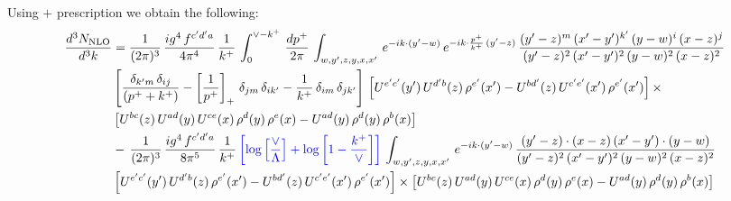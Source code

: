 \documentclass[9pt]{article}
\numberwithin{equation}{section}
\begin{document}
Using $+$ prescription we obtain the following:
\begin{align}
    \frac{d^{3}N_{\rm NLO}}{d^{3}k} & = \frac{1}{(2\pi)^{3}}\, \frac{ig^{4}\,f^{c'd'a}}{4\pi^{4}}\, \frac{1}{k^{+}}\,\int_{0}^{\vee-k^{+}}\, \frac{dp^{+}}{2\pi}\, \int_{w,y',z,y,x,x'}\, e^{-ik\cdot (y'-w)}\, e^{-ik\cdot \frac{p^{+}}{k^{+}}\,(y'-z)}\,\frac{(y'-z)^{m}\,(x'-y')^{k'}\,(y-w)^{i}\,(x-z)^{j}}{(y'-z)^{2}\,(x'-y')^{2}\,(y-w)^{2}\,(x-z)^{2}}\notag \\ & \left[\frac{\delta_{k'm}\,\delta_{ij}}{(p^{+}+k^{+})}-\left[\frac{1}{p^{+}}\right]_{+}\,\delta_{jm}\,\delta_{ik'}-\frac{1}{k^{+}}\, \delta_{im}\, \delta_{jk'}\right]\, \left[U^{e'c'}(y')\,U^{d'b}(z)\,\rho^{e'}(x')-U^{bd'}(z)\,U^{c'e'}(x')\,\rho^{e'}(x')\right]\times\notag \\ &  \left[U^{bc}(z)\,U^{ad}(y)\,U^{ce}(x)\,\rho^{d}(y)\,\rho^{e}(x)-U^{ad}(y)\,\rho^{d}(y)\,\rho^{b}(x)\right]\notag \\ &  -\,\frac{1}{(2\pi)^{3}}\, \frac{ig^{4}\,f^{c'd'a}}{8\pi^{5}}\, \frac{1}{k^{+}}\,{\color{blue}\left[\log{\left[\frac{\vee}{\Lambda}\right]} + \log{\left[1-\frac{k^{+}}{\vee}\right]}\right]}\, \int_{w,y',z,y,x,x'}\, e^{-ik\cdot (y'-w)}\,\frac{(y'-z)\cdot (x-z)\,(x'-y')\cdot (y-w)}{(y'-z)^{2}\,(x'-y')^{2}\,(y-w)^{2}\,(x-z)^{2}}\notag \\ & \left[U^{e'c'}(y')\,U^{d'b}(z)\,\rho^{e'}(x')-U^{bd'}(z)\,U^{c'e'}(x')\,\rho^{e'}(x')\right]\times  \left[U^{bc}(z)\,U^{ad}(y)\,U^{ce}(x)\,\rho^{d}(y)\,\rho^{e}(x)-U^{ad}(y)\,\rho^{d}(y)\,\rho^{b}(x)\right]
\end{align}
\end{document}
